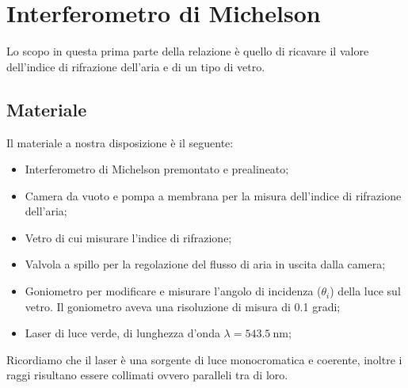 \section{Interferometro di Michelson}

Lo scopo in questa prima parte della relazione è quello di ricavare il valore dell'indice di rifrazione dell'aria e di un tipo di vetro.

\subsection{Materiale}

Il materiale a nostra disposizione è il seguente:
\begin{itemize}
	\item{Interferometro di Michelson premontato e prealineato;}
    \item{Camera da vuoto e pompa a membrana per la misura dell'indice di rifrazione dell'aria;}
    \item{Vetro di cui misurare l'indice di rifrazione;}
	\item{Valvola a spillo per la regolazione del flusso di aria in uscita dalla camera;}
	\item{Goniometro per modificare e misurare l'angolo di incidenza ($\theta_i$) della luce sul vetro. Il goniometro aveva una risoluzione di misura di 0.1 gradi;}
    \item{Laser di luce verde, di lunghezza d'onda $\lambda = \SI{543.5}{\nano\metre}$;}
\end{itemize}
Ricordiamo che il laser è una sorgente di luce monocromatica e coerente, inoltre i raggi risultano essere collimati ovvero paralleli tra di loro.


